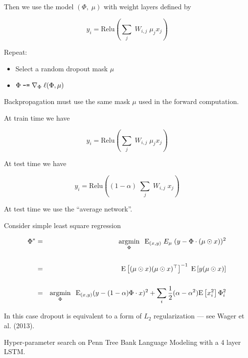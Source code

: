 {\vfill
Then we use the model $(\Phi,\;\mu)$ with weight layers defined by


\vfill
$$y_i = \mathrm{Relu}\left(\sum_j\;W_{i,j} \;\mu_jx_j\right)$$


Repeat:

\vfill

\begin{itemize}
\item Select a random dropout mask $\mu$
  
\vfill
\item $\Phi \;\mbox{\tt -=}\; \nabla_\Phi\; \ell(\Phi, \mu)$
\end{itemize}

\vfill
Backpropagation must use the same mask $\mu$ used in the forward computation.



\vfill
At train time we have

\vfill
$$y_i = \mathrm{Relu}\left(\sum_j\;W_{i,j} \;\mu_j x_j\right)$$


\vfill
At test time we have

\vfill
$$y_i = \mathrm{Relu}\left((1-\alpha)\;\sum_j\;W_{i,j} \;x_j\right)$$

\vfill
At test time we use the ``average network''.


Consider simple least square regression

\begin{eqnarray*}
  \Phi^* & = &  \operatorname*{argmin}_\Phi\;\; \mathrm{E}_{(x,y)} \;E_{\mu}\;(y - \Phi \cdot (\mu \odot x))^2 \\
  \\
  & = & \mathrm{E}\left[(\mu\odot x)(\mu\odot x)^{\top}\right]^{-1}\; \mathrm{E}\left[y (\mu\odot x)\right] \\
  \\
  & = & \operatorname*{argmin}_\Phi\;\; \mathrm{E}_{(x,y)} (y - (1-\alpha) \Phi \cdot x)^2 + \sum_i\frac{1}{2}(\alpha - \alpha^2) \mathrm{E}\left[x_i^2\right] \Phi_i^2
\end{eqnarray*}

\vfill
In this case dropout is equivalent to a form of $L_2$ regularization --- see Wager et al. (2013).


Hyper-parameter search on Penn Tree Bank Language Modeling with a 4 layer LSTM.

}
